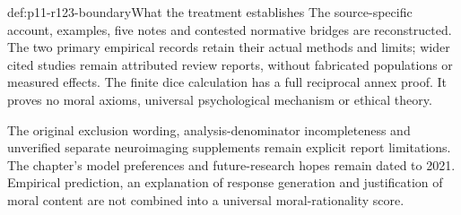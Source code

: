 \begin{proofboundary}{def:p11-r123-boundary}{What the treatment establishes}
The source-specific account, examples, five notes and contested normative
bridges are reconstructed. The two primary empirical records retain their
actual methods and limits; wider cited studies remain attributed review
reports, without fabricated populations or measured effects. The finite
dice calculation has a full reciprocal annex proof. It proves no moral
axioms, universal psychological mechanism or ethical theory.

The original exclusion wording, analysis-denominator incompleteness and
unverified separate neuroimaging supplements remain explicit report
limitations. The chapter's model preferences and future-research hopes
remain dated to 2021. Empirical prediction, an explanation of response
generation and justification of moral content are not combined into
a universal moral-rationality score.
\end{proofboundary}

